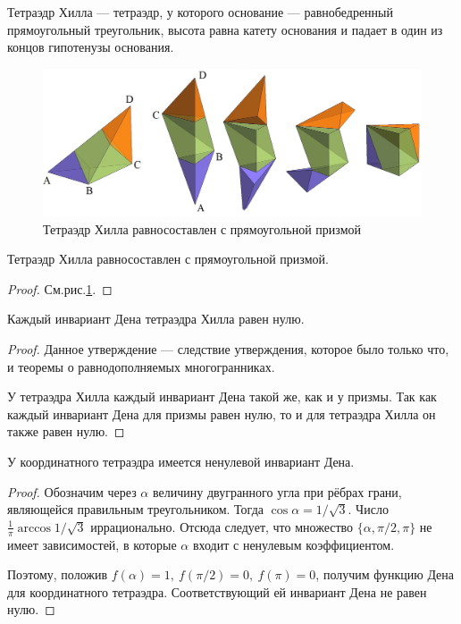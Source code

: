 \begin{definition}
    Тетраэдр Хилла — тетраэдр, у которого основание — равнобедренный прямоугольный треугольник, высота равна катету основания и падает в один из концов гипотенузы основания.
\end{definition} 
\begin{figure}[htbp]
    \centering
    \includegraphics[scale=0.2]{images/c9.8.png}
    \caption{Тетраэдр Хилла равносоставлен с прямоугольной призмой}
    \label{fig:c9.8}
\end{figure}

\begin{statement}
    Тетраэдр Хилла равносоставлен с прямоугольной призмой.
\end{statement} 
\begin{proof}
    См.рис.\ref{fig:c9.8}.
\end{proof} 

\begin{statement}
    Каждый инвариант Дена тетраэдра Хилла равен нулю.
\end{statement} 
\begin{proof}
    Данное утверждение — следствие утверждения, которое было только что, и теоремы о равнодополняемых многогранниках.

    У тетраэдра Хилла каждый инвариант Дена такой же, как и у призмы. Так как каждый инвариант Дена для призмы равен нулю, то и для тетраэдра Хилла он также равен нулю.
\end{proof} 

\begin{statement}
    У координатного тетраэдра имеется ненулевой инвариант Дена.
\end{statement} 
\begin{proof}
    Обозначим через $\alpha$ величину двугранного угла при рёбрах грани, являющейся правильным треугольником. Тогда $\cos{\alpha} = 1 / \sqrt{3}$. Число $\frac{1}{\pi} \arccos{1/\sqrt{3}}$ иррационально. Отсюда следует, что множество $\{\alpha, \pi/2, \pi\}$ не имеет зависимостей, в которые $\alpha$ входит с ненулевым коэффициентом.

    Поэтому, положив $f(\alpha) = 1, \ f(\pi/2) = 0, \ f(\pi) = 0$, получим функцию Дена для координатного тетраэдра. Соответствующий ей инвариант Дена не равен нулю.
\end{proof} 

